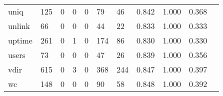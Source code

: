\begin{longtable}{lp{1.2cm}p{1.2cm}p{1.2cm}p{1.2cm}p{1.2cm}p{1.2cm}p{1.2cm}p{1.2cm}p{1.2cm}p{1.2cm}}
uniq      &                                   125 &                                                  0 &                                                  0 &                                                  0 &                                                 79 &                                                 46 &                                         0.842 &                                              1.000 &                                              0.368 \\
unlink    &                                    66 &                                                  0 &                                                  0 &                                                  0 &                                                 44 &                                                 22 &                                         0.833 &                                              1.000 &                                              0.333 \\
uptime    &                                   261 &                                                  0 &                                                  1 &                                                  0 &                                                174 &                                                 86 &                                         0.830 &                                              1.000 &                                              0.330 \\
users     &                                    73 &                                                  0 &                                                  0 &                                                  0 &                                                 47 &                                                 26 &                                         0.839 &                                              1.000 &                                              0.356 \\
vdir      &                                   615 &                                                  0 &                                                  3 &                                                  0 &                                                368 &                                                244 &                                         0.847 &                                              1.000 &                                              0.397 \\
wc        &                                   148 &                                                  0 &                                                  0 &                                                  0 &                                                 90 &                                                 58 &                                         0.848 &                                              1.000 &                                              0.392 \\

\end{longtable}
